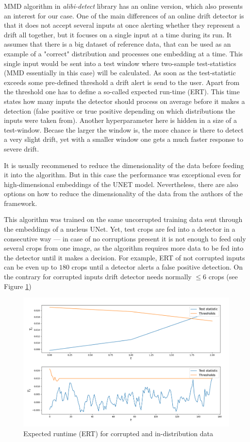 MMD algorithm in \textit{alibi-detect} library has an online version, which also presents an interest for our case. One of the main differences of an online drift detector is that it does not accept several inputs at once alerting whether they represent a drift all together, but it focuses on a single input at a time during its run. It assumes that there is a big dataset of reference data, that can be used as an example of a "correct" distribution and processes one embedding at a time. This single input would be sent into a test window where two-sample test-statistics (MMD essentially in this case) will be calculated. As soon as the test-statistic exceeds some pre-defined threshold a drift alert is send to the user. Apart from the threshold one has to define a so-called expected run-time (ERT). This time states how many inputs the detector should process on average before it makes a detection (false positive or true positive depending on which distributions the inputs were taken from). Another hyperparameter here is hidden in a size of a test-window. Becase the larger the window is, the more chance is there to detect a very slight drift, yet with a smaller window one gets a much faster response to severe drift. 

It is usually recommened to reduce the dimensionality of the data before feeding it into the algorithm. But in this case the performance was exceptional even for high-dimensional embeddings of the UNET model. Nevertheless, there are also options on how to reduce the dimensionality of the data from the authors of the framework.

This algorithm was trained on the same uncorrupted training data sent through the embeddings of a nucleus UNet. Yet, test crops are fed into a detector in a consecutive way --- in case of no corruptions present it is not enough to feed only several crops from one image, as the algorithm requires more data to be fed into the detector until it makes a decision. For example, ERT of not corrupted inputs can be even up to $180$ crops until a detector alerts a false positive detection. On the contrary for corrupted inputs drift detector needs normally $\leq 6$ crops (see Figure \ref{fig:online-ert})
\begin{figure}[H]
	\begin{center}
		\includegraphics[width=0.6\linewidth]{bilder/drift-detection/online.png}
		\caption{Expected runtime (ERT) for corrupted and in-distribution data}\label{fig:online-ert}
	\end{center}
\end{figure}

